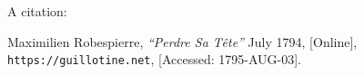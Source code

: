 \documentclass{article}
\begin{document}
A citation: \cite{robes}
\begin{thebibliography}{1}
        Maximilien Robespierre,
        \emph{``Perdre Sa T\^ete''}
        July 1794,
        [Online],
        \texttt{https://guillotine.net},
        [Accessed: 1795-AUG-03].
\end{thebibliography}
\end{document}
